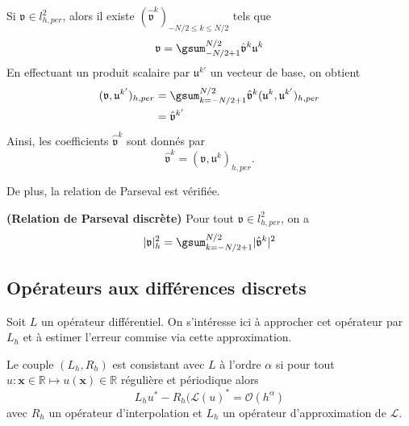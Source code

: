 Si $\mathfrak{v} \in l^2_{h,per}$, alors il existe $(\hat{\mathfrak{v}}^k )_{-N/2 \leq k \leq N/2}$ tels que 
\begin{equation}
\mathfrak{v} = \gsum_{-N/2+1}^{N/2} \hat{\mathfrak{v}}^k \mathfrak{u}^k
\end{equation}
En effectuant un produit scalaire par $\mathfrak{u}^{k'}$ un vecteur de base, on obtient
\begin{align*}
(\mathfrak{v}, \mathfrak{u}^{k'})_{h,per} & = \gsum_{k=-N/2+1}^{N/2} \hat{\mathfrak{v}}^k (\mathfrak{u}^k, \mathfrak{u}^{k'})_{h,per} \\
		& = \hat{\mathfrak{v}}^{k'}
\end{align*}
Ainsi, les coefficients $\hat{\mathfrak{v}}^{k}$ sont donnés par
\begin{equation}
\hat{\mathfrak{v}}^{k} = (\mathfrak{v}, \mathfrak{u}^{k})_{h,per}.
\end{equation}

De plus, la relation de Parseval est vérifiée.
\begin{proposition}
\textbf{(Relation de Parseval discrète)} Pour tout $\mathfrak{v} \in l^2_{h,per}$, on a 
\begin{equation}
|\mathfrak{v}|_h^2 = \gsum_{k = -N/2+1}^{N/2} |\hat{\mathfrak{v}}^{k}|^2
\end{equation}
\end{proposition}



















\subsection{Opérateurs aux différences discrets}

Soit $L$ un opérateur différentiel. On s'intéresse ici à approcher cet opérateur par $L_h$ et à estimer l'erreur commise via cette approximation.

\begin{definition}
Le couple $(L_h, R_h)$ est consistant avec $L$ à l'ordre $\alpha$ si pour tout $u : \mathbf{x} \in \mathbb{R} \mapsto u(\mathbf{x}) \in \mathbb{R}$ régulière et périodique alors 
\begin{equation}
L_h u^* - R_h (\mathcal{L}(u)^* = \mathcal{O} \left ( h^{\alpha} \right)
\end{equation}
avec $R_h$ un opérateur d'interpolation et $L_h$ un opérateur d'approximation de $\mathcal{L}$.
\end{definition}







